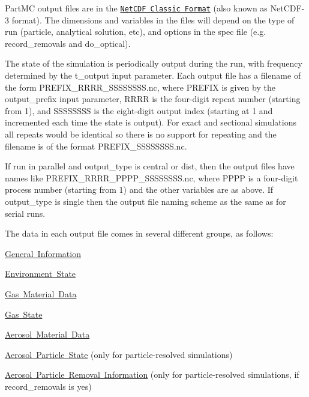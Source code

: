 Part\+MC output files are in the \href{http://www.unidata.ucar.edu/software/netcdf/}{\tt Net\+C\+DF Classic Format} (also known as Net\+C\+D\+F-\/3 format). The dimensions and variables in the files will depend on the type of run (particle, analytical solution, etc), and options in the spec file (e.\+g. {\ttfamily record\+\_\+removals} and {\ttfamily do\+\_\+optical}).

The state of the simulation is periodically output during the run, with frequency determined by the {\ttfamily t\+\_\+output} input parameter. Each output file has a filename of the form {\ttfamily P\+R\+E\+F\+I\+X\+\_\+\+R\+R\+R\+R\+\_\+\+S\+S\+S\+S\+S\+S\+S\+S.\+nc}, where {\ttfamily P\+R\+E\+F\+IX} is given by the {\ttfamily output\+\_\+prefix} input parameter, {\ttfamily R\+R\+RR} is the four-\/digit repeat number (starting from 1), and {\ttfamily S\+S\+S\+S\+S\+S\+SS} is the eight-\/digit output index (starting at 1 and incremented each time the state is output). For exact and sectional simulations all repeats would be identical so there is no support for repeating and the filename is of the format {\ttfamily P\+R\+E\+F\+I\+X\+\_\+\+S\+S\+S\+S\+S\+S\+S\+S.\+nc}.

If run in parallel and {\ttfamily output\+\_\+type} is {\ttfamily central} or {\ttfamily dist}, then the output files have names like {\ttfamily P\+R\+E\+F\+I\+X\+\_\+\+R\+R\+R\+R\+\_\+\+P\+P\+P\+P\+\_\+\+S\+S\+S\+S\+S\+S\+S\+S.\+nc}, where {\ttfamily P\+P\+PP} is a four-\/digit process number (starting from 1) and the other variables are as above. If {\ttfamily output\+\_\+type} is {\ttfamily single} then the output file naming scheme as the same as for serial runs.

The data in each output file comes in several different groups, as follows\+:

\mbox{\hyperlink{output_format_general}{General Information}}

\mbox{\hyperlink{output_format_env_state}{Environment State}}

\mbox{\hyperlink{output_format_gas_data}{Gas Material Data}}

\mbox{\hyperlink{output_format_gas_state}{Gas State}}

\mbox{\hyperlink{output_format_aero_data}{Aerosol Material Data}}

\mbox{\hyperlink{output_format_aero_state}{Aerosol Particle State}} (only for particle-\/resolved simulations)

\mbox{\hyperlink{output_format_aero_removed}{Aerosol Particle Removal Information}} (only for particle-\/resolved simulations, if {\ttfamily record\+\_\+removals} is {\ttfamily yes})

